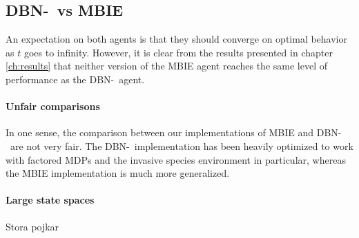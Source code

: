 \subsection{DBN-\etre\ vs MBIE }
An expectation on both agents is that they should converge on optimal behavior as $t$ goes to infinity. However, it is clear from the results presented in chapter \ref{ch:results} that neither version of the MBIE agent reaches the same level of performance as the DBN-\etre\ agent. 

\paragraph{Unfair comparisons} In one sense, the comparison between our implementations of MBIE and DBN-\etre\ are not very fair. The DBN-\etre\ implementation has been heavily optimized to work with factored MDPs and the invasive species environment in particular, whereas the MBIE implementation is much more generalized. %

\paragraph{Large state spaces}
Stora pojkar

